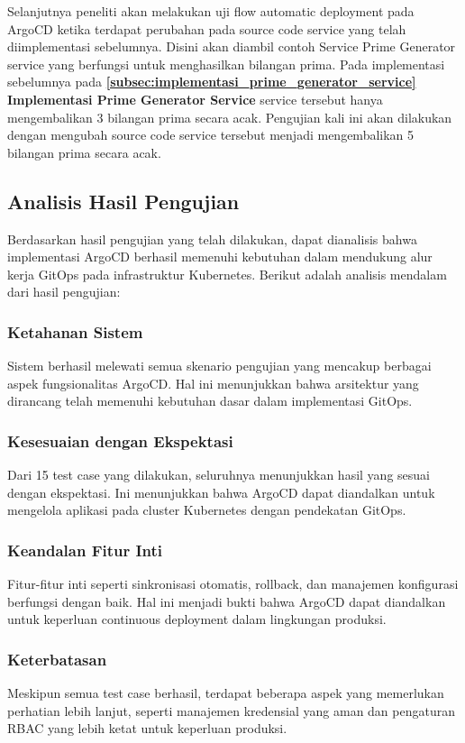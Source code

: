 Selanjutnya peneliti akan melakukan uji flow automatic deployment pada ArgoCD
ketika terdapat perubahan pada source code service yang telah diimplementasi
sebelumnya. Disini akan diambil contoh Service Prime Generator service yang
berfungsi untuk menghasilkan bilangan prima. Pada implementasi sebelumnya pada
\textbf{\ref{subsec:implementasi_prime_generator_service} Implementasi Prime
  Generator Service} service tersebut hanya mengembalikan 3 bilangan prima secara
acak. Pengujian kali ini akan dilakukan dengan mengubah source code service
tersebut menjadi mengembalikan 5 bilangan prima secara acak.

\subsection{Analisis Hasil Pengujian}\label{subsec:analisis_hasil}
Berdasarkan hasil pengujian yang telah dilakukan, dapat dianalisis bahwa
implementasi ArgoCD berhasil memenuhi kebutuhan dalam mendukung alur kerja
GitOps pada infrastruktur Kubernetes. Berikut adalah analisis mendalam dari
hasil pengujian:

\subsubsection{Ketahanan Sistem}
Sistem berhasil melewati semua skenario pengujian yang mencakup berbagai aspek
fungsionalitas ArgoCD. Hal ini menunjukkan bahwa arsitektur yang dirancang
telah memenuhi kebutuhan dasar dalam implementasi GitOps.

\subsubsection{Kesesuaian dengan Ekspektasi}
Dari 15 test case yang dilakukan, seluruhnya menunjukkan hasil yang sesuai
dengan ekspektasi. Ini menunjukkan bahwa ArgoCD dapat diandalkan untuk
mengelola aplikasi pada cluster Kubernetes dengan pendekatan GitOps.

\subsubsection{Keandalan Fitur Inti}
Fitur-fitur inti seperti sinkronisasi otomatis, rollback, dan manajemen
konfigurasi berfungsi dengan baik. Hal ini menjadi bukti bahwa ArgoCD dapat
diandalkan untuk keperluan continuous deployment dalam lingkungan produksi.

\subsubsection{Keterbatasan}
Meskipun semua test case berhasil, terdapat beberapa aspek yang memerlukan
perhatian lebih lanjut, seperti manajemen kredensial yang aman dan pengaturan
RBAC yang lebih ketat untuk keperluan produksi.

